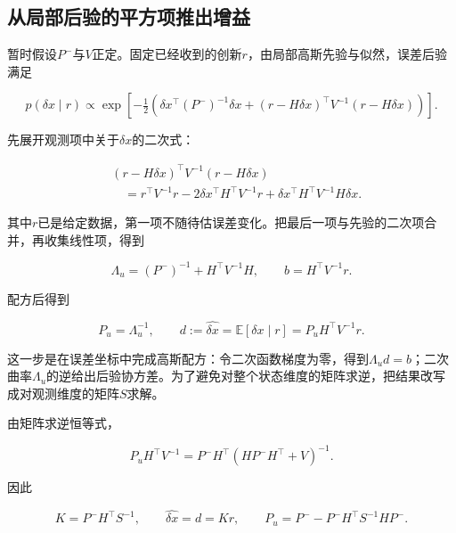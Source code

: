 \subsection{从局部后验的平方项推出增益}

暂时假设$P^-$与$V$正定。固定已经收到的创新$r$，由局部高斯先验与似然，误差后验满足

\begin{equation*}
p(\delta x\mid r)\propto
 \exp\left[-\tfrac12\left(
 \delta x^\top(P^-)^{-1}\delta x
 +(r-H\delta x)^\top V^{-1}(r-H\delta x)\right)\right].
\end{equation*}

先展开观测项中关于$\delta x$的二次式：

\begin{equation*}
\begin{aligned}
 &(r-H\delta x)^\top V^{-1}(r-H\delta x)\\
 &\quad=r^\top V^{-1}r
       -2\delta x^\top H^\top V^{-1}r
       +\delta x^\top H^\top V^{-1}H\delta x.
\end{aligned}
\end{equation*}

其中$r$已是给定数据，第一项不随待估误差变化。把最后一项与先验的二次项合并，再收集线性项，得到

\begin{equation*}
\Lambda_u=(P^-)^{-1}+H^\top V^{-1}H,
 \qquad b=H^\top V^{-1}r.
\end{equation*}

配方后得到

\begin{equation*}
P_u=\Lambda_u^{-1},\qquad
 d:=\widehat{\delta x}=\mathbb E[\delta x\mid r]=P_uH^\top V^{-1}r.
\end{equation*}

这一步是在误差坐标中完成高斯配方：令二次函数梯度为零，得到$\Lambda_ud=b$；二次曲率$\Lambda_u$的逆给出后验协方差。为了避免对整个状态维度的矩阵求逆，把结果改写成对观测维度的矩阵$S$求解。

由矩阵求逆恒等式，

\begin{equation*}
P_uH^\top V^{-1}
 =P^-H^\top(HP^-H^\top+V)^{-1}.
\end{equation*}

因此

\begin{equation*}
\boxed{K=P^-H^\top S^{-1},\qquad \widehat{\delta x}=d=Kr,\qquad
 P_u=P^--P^-H^\top S^{-1}HP^-.}
\end{equation*}

